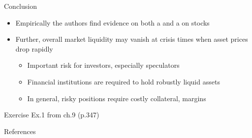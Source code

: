 \documentclass[english,10pt
,aspectratio=169
]{beamer}
\begin{document}
\begin{frame}{Conclusion}
	\begin{itemize}
		\item Empirically the authors find evidence on both a  and a  on stocks
		\item Further, overall market liquidity may vanish at crisis times when asset prices drop rapidly
		\begin{itemize}
			\item Important risk for investors, especially speculators
			\item Financial institutions are required to hold robustly liquid assets
			\item In general, risky positions require costly collateral, margins
		\end{itemize}
	\end{itemize}
\end{frame}


\begin{frame}{Exercise}
	Ex.1 from ch.9 (p.347)
\end{frame}


\appendix
\begin{frame}[allowframebreaks]{References}
	
	
\end{frame}
\end{document}
